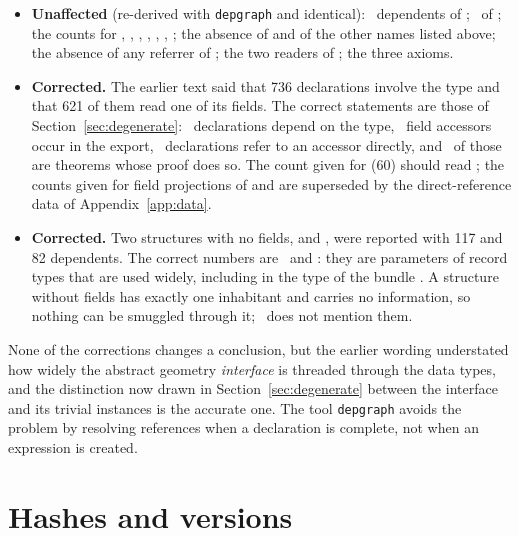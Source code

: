 \begin{itemize}
\item \textbf{Unaffected} (re-derived with \texttt{depgraph} and identical): \NanyGeo\ dependents of ; \NgeoDeg\ of ; the counts for , , , , , , ;
the absence of  and of the other names listed above; the absence of any referrer of ; the two readers of ; the three axioms.
\item \textbf{Corrected.} The earlier text said that 736 declarations involve the type  and that 621 of them read one of its fields. The correct statements are those of Section~\ref{sec:degenerate}:
\NifaceDeps\ declarations depend on the type, \Nacc\ field accessors occur in the export, \NaccDirect\ declarations refer to an accessor directly, and \NaccThmProof\ of those are theorems whose proof does so.
The count given for  (60) should read \NgeoTiedP; the counts given for field projections of  and  are superseded by the direct-reference data of Appendix~\ref{app:data}.
\item \textbf{Corrected.} Two structures with no fields,  and , were reported with 117 and 82 dependents. The correct numbers are \NplaceLP\ and \NplaceNT:
they are parameters of record types that are used widely, including in the type of the bundle . A structure without fields has exactly one inhabitant and carries no information, so nothing can be smuggled through it; \N\ does not mention them.
\end{itemize}

None of the corrections changes a conclusion, but the earlier wording understated how widely the abstract geometry \emph{interface} is threaded through the data types, and the distinction now drawn in Section~\ref{sec:degenerate} between the interface and its trivial instances is the accurate one.
The tool \texttt{depgraph} avoids the problem by resolving references when a declaration is complete, not when an expression is created.

\section{Hashes and versions}
\label{app:hashes}

